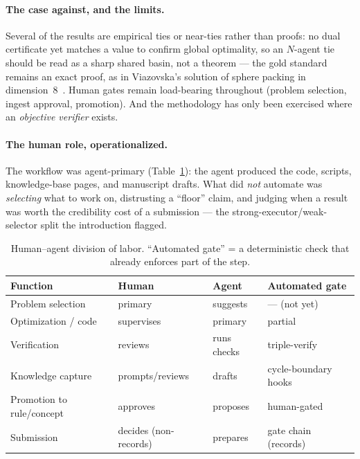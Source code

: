 \documentclass[11pt]{article}
\begin{document}
\paragraph{The case against, and the limits.}
Several of the results are empirical ties or near-ties rather than proofs: no dual
certificate yet matches a value to confirm global optimality, so an $N$-agent tie should be
read as a sharp shared basin, not a theorem --- the gold standard remains an exact proof, as
in Viazovska's solution of sphere packing in dimension~8~\cite{viazovska2016spherepacking}. Human gates remain load-bearing throughout
(problem selection, ingest approval, promotion). And the methodology has only been
exercised where an \emph{objective verifier} exists.

\paragraph{The human role, operationalized.}
The workflow was agent-primary (Table~\ref{tab:roles}): the agent produced the code, scripts,
knowledge-base pages, and manuscript drafts. What did \emph{not} automate was \emph{selecting}
what to work on, distrusting a ``floor'' claim, and judging when a result was worth the
credibility cost of a submission --- the strong-executor/weak-selector split the introduction
flagged.

\begin{table}[htbp]
\centering
\caption{Human--agent division of labor. ``Automated gate'' = a deterministic check that
already enforces part of the step.}
\label{tab:roles}
\begin{tabular}{llll}
\toprule
Function & Human & Agent & Automated gate \\
\midrule
Problem selection          & primary   & suggests      & --- (not yet) \\
Optimization / code         & supervises& primary       & partial \\
Verification                & reviews   & runs checks   & triple-verify \\
Knowledge capture           & prompts/reviews & drafts  & cycle-boundary hooks \\
Promotion to rule/concept   & approves  & proposes      & human-gated \\
Submission                  & decides (non-records) & prepares & gate chain (records) \\
\bottomrule
\end{tabular}
\end{table}
\end{document}
